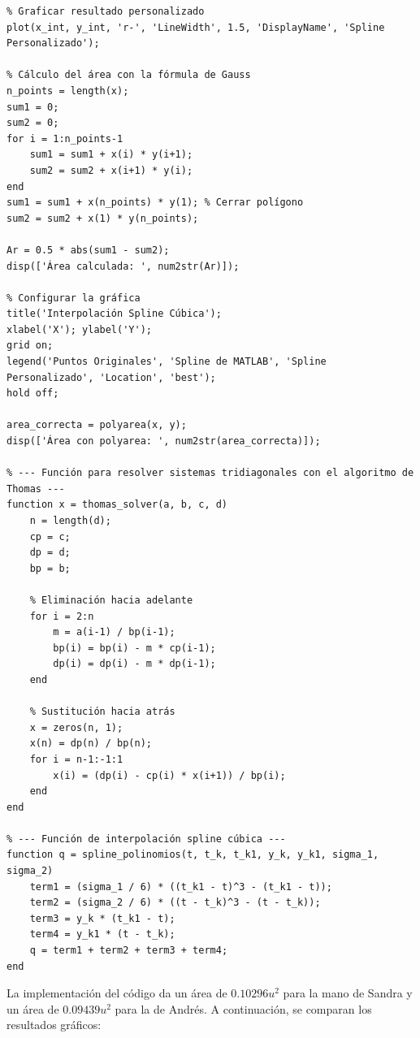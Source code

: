 \begin{homeworkProblem}
\begin{solucion}
\begin{lstlisting}
% Graficar resultado personalizado
plot(x_int, y_int, 'r-', 'LineWidth', 1.5, 'DisplayName', 'Spline Personalizado');

% Cálculo del área con la fórmula de Gauss
n_points = length(x);
sum1 = 0;
sum2 = 0;
for i = 1:n_points-1
    sum1 = sum1 + x(i) * y(i+1);
    sum2 = sum2 + x(i+1) * y(i);
end
sum1 = sum1 + x(n_points) * y(1); % Cerrar polígono
sum2 = sum2 + x(1) * y(n_points);

Ar = 0.5 * abs(sum1 - sum2);
disp(['Área calculada: ', num2str(Ar)]);

% Configurar la gráfica
title('Interpolación Spline Cúbica');
xlabel('X'); ylabel('Y');
grid on;
legend('Puntos Originales', 'Spline de MATLAB', 'Spline Personalizado', 'Location', 'best');
hold off;

area_correcta = polyarea(x, y);
disp(['Área con polyarea: ', num2str(area_correcta)]);

% --- Función para resolver sistemas tridiagonales con el algoritmo de Thomas ---
function x = thomas_solver(a, b, c, d)
    n = length(d);
    cp = c;   
    dp = d;   
    bp = b;   
    
    % Eliminación hacia adelante
    for i = 2:n
        m = a(i-1) / bp(i-1);
        bp(i) = bp(i) - m * cp(i-1);
        dp(i) = dp(i) - m * dp(i-1);
    end
    
    % Sustitución hacia atrás
    x = zeros(n, 1);
    x(n) = dp(n) / bp(n);
    for i = n-1:-1:1
        x(i) = (dp(i) - cp(i) * x(i+1)) / bp(i);
    end
end

% --- Función de interpolación spline cúbica ---
function q = spline_polinomios(t, t_k, t_k1, y_k, y_k1, sigma_1, sigma_2)
    term1 = (sigma_1 / 6) * ((t_k1 - t)^3 - (t_k1 - t));
    term2 = (sigma_2 / 6) * ((t - t_k)^3 - (t - t_k));
    term3 = y_k * (t_k1 - t);
    term4 = y_k1 * (t - t_k);
    q = term1 + term2 + term3 + term4;
end

\end{lstlisting}
La implementación del código da un área de $0.10296 u^2$ para la mano de Sandra y un área de $0.09439 u^2$ para la de Andrés. A continuación, se comparan los resultados gráficos:


\end{solucion}
\end{homeworkProblem}
